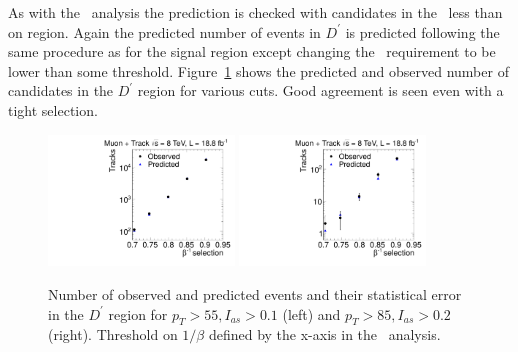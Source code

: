 As with the \muononly\ analysis the prediction is checked with candidates in the \invbeta\ less than on region. Again the predicted number of events in
$D^{\prime}$ is predicted following the same procedure as for the signal region except changing the \invbeta\ requirement to be lower than some threshold.
Figure~\ref{fig:PredFlipTkTOF} shows the predicted and observed number of candidates in the $D^{\prime}$ region for various cuts. Good agreement is seen
even with a tight selection.

\begin{figure}
\begin{center}
\includegraphics[clip=true, trim=0.0cm 0cm 3.0cm 0cm, width=0.44\textwidth]{figures/tkmu/Pred_Flip_I010_Pt55_Data8TeV}
\includegraphics[clip=true, trim=0.0cm 0cm 3.0cm 0cm, width=0.44\textwidth]{figures/tkmu/Pred_Flip_I020_Pt85_Data8TeV}
\caption{Number of observed and predicted events and their statistical error in the $D^\prime$ region for $p_T>55, I_{as}>0.1$ (left)
and $p_T>85, I_{as}>0.2$ (right). Threshold on $1/\beta$ defined by the x-axis
in the \tktof\ analysis.
\label{fig:PredFlipTkTOF}}
\end{center}
\end{figure}


